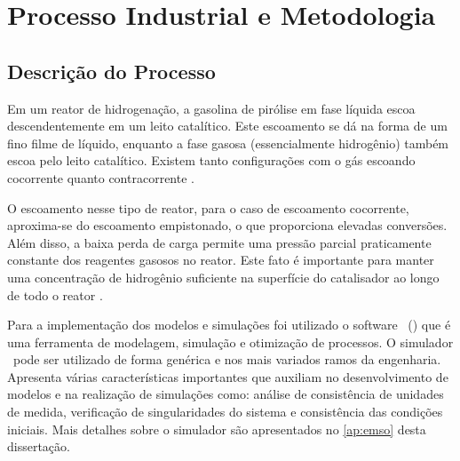 %
%
%
\chapter{Processo Industrial e Metodologia}
\label{chap:moddesenvolvidos}

\section{Descrição do Processo} \label{sec:descricaoprocesso}

Em um reator de hidrogenação, a gasolina de pirólise em fase líquida escoa
descendentemente em um leito catalítico. Este escoamento se dá na forma de um
fino filme de líquido, enquanto a fase gasosa (essencialmente hidrogênio)
também escoa pelo leito catalítico. Existem tanto configurações com o gás
escoando cocorrente quanto contracorrente \cite{Authayanun2008}.

O escoamento nesse tipo de reator, para o caso de escoamento cocorrente,
aproxima-se do escoamento empistonado, o que proporciona elevadas conversões.
Além disso, a baixa perda de carga permite uma pressão parcial praticamente
constante dos reagentes gasosos no reator. Este fato é importante para manter
uma concentração de hidrogênio suficiente na superfície do catalisador ao longo
de todo o reator \cite{Authayanun2008}.

Para a implementação dos modelos e simulações foi utilizado o software \emso\
(\emsoname) que é uma ferramenta de modelagem, simulação e
otimização de processos.
O simulador \emso\ pode ser utilizado de forma genérica e nos mais variados
ramos da engenharia. Apresenta várias características importantes que auxiliam
no desenvolvimento de modelos e na realização de simulações como: análise de
consistência de unidades de medida, verificação de singularidades do sistema e
consistência das condições iniciais. Mais detalhes sobre o simulador são
apresentados no \autoref{ap:emso} desta dissertação.



